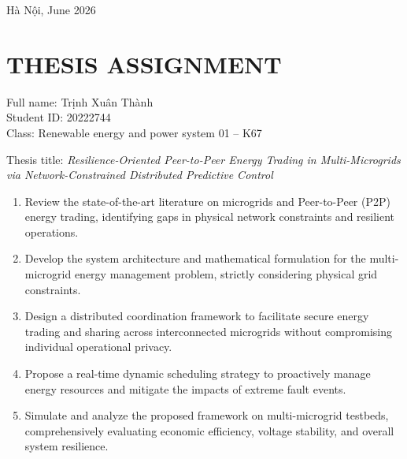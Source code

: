\documentclass{thesis_1side}
\begin{document}
\begin{titlepage}
\vfill

\begin{center}
    \fontsize{14pt}{18pt}\selectfont{} Hà Nội, June 2026
\end{center}
\end{titlepage}

    \cleardoublepage

\section*{THESIS ASSIGNMENT}
    \thispagestyle{empty}

\vspace{0.5cm}
\noindent Full name: Trịnh Xuân Thành \\
\noindent Student ID: 20222744 \\
\noindent Class: Renewable energy and power system 01 -- K67
\vspace{0.5cm}

\noindent Thesis title: \textit{Resilience-Oriented Peer-to-Peer Energy Trading in Multi-Microgrids via Network-Constrained Distributed Predictive Control}

\begin{sloppypar}
\begin{enumerate}[label=\Roman*.]
    \item Review the state-of-the-art literature on microgrids and Peer-to-Peer (P2P) energy trading, identifying gaps in physical network constraints and resilient operations.
    \item Develop the system architecture and mathematical formulation for the multi-microgrid energy management problem, strictly considering physical grid constraints.
    \item Design a distributed coordination framework to facilitate secure energy trading and sharing across interconnected microgrids without compromising individual operational privacy.
    \item Propose a real-time dynamic scheduling strategy to proactively manage energy resources and mitigate the impacts of extreme fault events.
    \item Simulate and analyze the proposed framework on multi-microgrid testbeds, comprehensively evaluating economic efficiency, voltage stability, and overall system resilience.
\end{enumerate}
\end{sloppypar}
\end{document}
